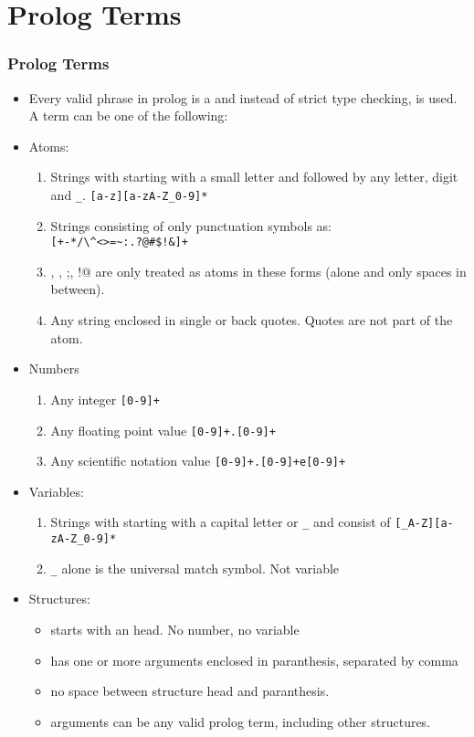 \section{Prolog Terms}
\begin{frame}[fragile]
\frametitle{Prolog Terms}
\begin{itemize}
\item Every valid phrase in prolog is a  and instead of strict type checking,  is used. A term can be one of the following:
\item Atoms:
	\begin{enumerate}
	\item Strings with starting with a small letter and followed by any letter, digit and \lstinline!_!.
		\lstinline{[a-z][a-zA-Z_0-9]*}
	\item Strings consisting of only punctuation symbols as:\\
        \lstinline{[+-*/\^<>=~:.?@#$!&]+}
\item \lstinline@[],  {},  ;, !@ are only treated as atoms in these  forms (alone and only
spaces in between).
	\item Any string enclosed in single or back quotes. Quotes are not part of the atom.
	\end{enumerate}
\item Numbers
    \begin{enumerate}
    \item Any integer \lstinline![0-9]+!
    \item Any floating point value \lstinline![0-9]+.[0-9]+!
    \item Any scientific notation value \lstinline![0-9]+.[0-9]+e[0-9]+!
    \end{enumerate}
\end{itemize}
\end{frame}
\begin{frame}
\begin{itemize}
\item Variables:
	\begin{enumerate}
	\item Strings with starting with a capital letter or {\tt \_} and consist of
		\lstinline![_A-Z][a-zA-Z_0-9]*!
	\item {\tt \_} alone is the universal match symbol. Not variable
	\end{enumerate}
\item Structures:
	\begin{itemize}
	\item starts with an  head. No number, no variable
	\item has one or more arguments enclosed in paranthesis, separated by comma
	\item no space between structure head and paranthesis.
    \item arguments can be any valid prolog term, including other structures.
	\end{itemize}
\end{itemize}
\end{frame}

